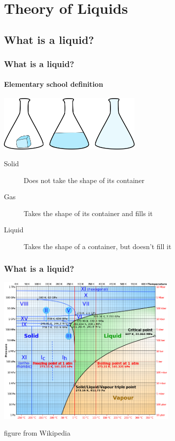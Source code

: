 \section{Theory of Liquids}
\subsection*{What is a liquid?}
\begin{frame}
  \frametitle{What is a liquid?}
  \framesubtitle{Elementary school definition}
  \begin{center}
    \includegraphics[width=7cm]{figs/solid-liquid-gas}
  \end{center}
  \begin{description}
  \item[Solid] Does not take the shape of its container
  \item[Gas] Takes the shape of its container and fills it
  \item[Liquid] Takes the shape of a container, but doesn't fill it
  \end{description}
\end{frame}

\begin{frame}
  \frametitle{What is a liquid?}
  \begin{center}
    \includegraphics[width=8.8cm]{figs/water-phase-diagram}
  \end{center}
  \vspace{-1em}
  \hfill \tiny figure from Wikipedia
\end{frame}

